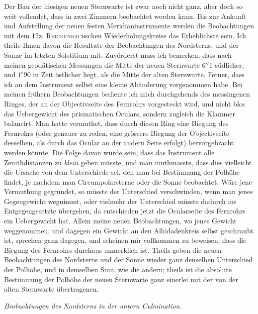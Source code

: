 \par\indent Der Bau der hiesigen neuen Sternwarte ist zwar noch nicht ganz, aber doch so weit vollendet, dass in zwei Zimmern beobachtet werden kann. Bis zur Ankunft und Aufstellung der neuen festen Meridianinstrumente werden die Beobachtungen mit dem 12z. \textsc{Reichenbach}schen Wiederholungskreise das Erheblichste sein. Ich theile Ihnen davon die Resultate der Beobachtungen des Nordsterns, und der Sonne im letzten Solstitium mit. Zuvörderst muss ich bemerken, dass nach meinen geodätischen Messungen die Mitte der neuen Sternwarte $6''1$ südlicher, und $1^{\mathrm s}90$ in Zeit östlicher liegt, als die Mitte der alten Sternwarte. Ferner, dass ich an dem Instrument selbst eine kleine Abänderung vorgenommen habe. Bei meinen frühern Beobachtungen bediente ich mich durchgehends des messingenen Ringes, der an der Objectivseite des Fernrohrs vorgesteckt wird, und nicht blos das Uebergewicht des prismatischen Oculars, sondern zugleich die Klammer balancirt. Man hatte vermuthet, dass durch diesen Ring eine Biegung des Fernrohrs (oder genauer zu reden, eine grössere Biegung der Objectivseite desselben, als durch das Ocular an der andern Seite erfolgt) hervorgebracht werden könnte. Die Folge davon würde sein, dass das Instrument alle Zenithdistanzen zu \emph{klein} geben müsste, und man muthmasste, dass dies vielleicht die Ursache von dem Unterschiede sei, den man bei Bestimmung der Polhöhe findet, je nachdem man Circumpolarsterne oder die Sonne beobachtet. Wäre jene Vermuthung gegründet, so müsste der Unterschied verschwinden, wenn man jenes Gegengewicht wegnimmt, oder vielmehr der Unterschied müsste dadurch ins Entgegengesetzte übergehen, da entschieden jetzt die Ocularseite des Fernrohrs ein Uebergewicht hat. Allein meine neuen Beobachtungen, wo jenes Gewicht weggenommen, und dagegen ein Gewicht an den Alhidadenkreis selbst geschraubt ist, sprechen ganz dagegen, und scheinen mir vollkommen zu beweisen, dass die Biegung des Fernrohrs durchaus unmerklich ist. Theils geben die neuen Beobachtungen des Nordsterns und der Sonne wieder ganz denselben Unterschied der Polhöhe, und in demselben Sinn, wie die andern; theils ist die absolute Bestimmung der Polhöhe der
neuen Sternwarte ganz einerlei mit der von der alten Sternwarte übertragenen.

\par\indent\emph{Beobachtungen des Nordsterns in der untern Culmination.}

